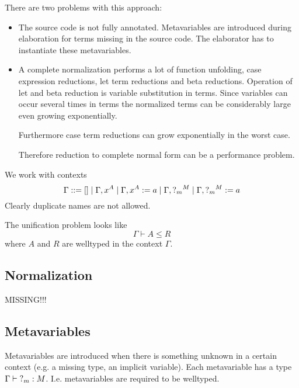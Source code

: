 There are two problems with this approach:

\begin{itemize}

    \item The source code is not fully annotated. Metavariables are introduced
        during elaboration for terms missing in the source code. The elaborator
        has to instantiate these metavariables.

    \item A complete normalization performs a lot of function unfolding, case
        expression reductions, let term reductions and beta reductions.
        Operation of let and beta reduction is variable substitution in terms.
        Since variables can occur several times in terms the normalized terms
        can be considerably large even growing exponentially.

        Furthermore case term reductions can grow exponentially in the worst
        case.

        Therefore reduction to complete normal form can be a performance
        problem.
\end{itemize}


We work with contexts
$$
    \Gamma ::= [] \mid \Gamma,x^A \mid \Gamma, x^A := a \mid \Gamma, {?_{m}}^M
                \mid \Gamma, {?_{m}}^M := a
$$
Clearly duplicate names are not allowed.

The unification problem looks like
$$
\Gamma \vdash A \le R
$$
where $A$ and $R$ are welltyped in the context $\Gamma$.





\subsection{Normalization}


MISSING!!!





\subsection{Metavariables}


Metavariables are introduced when there is something unknown in a certain
context (e.g. a missing type, an implicit variable). Each metavariable has a
type $\Gamma \vdash {?_{m}} : M$. I.e. metavariables are required to be
welltyped.

